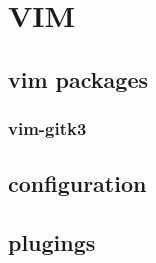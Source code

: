 \chapter{VIM} 

\section{vim packages} 

\subsection{vim-gitk3} 
\section{configuration} 

\section{plugings} 

